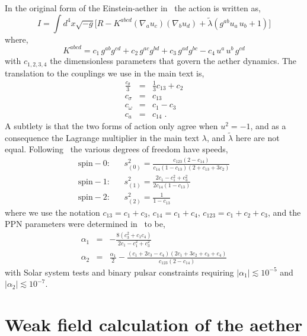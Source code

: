 \documentclass[12pt]{article}
\numberwithin{equation}{section}
\begin{document}
In the original form of the Einstein-aether in~\cite{Jacobson:2004ts} the action is written as,
\begin{equation}
I=\int d^4x\sqrt{-g}\bigg[R-K^{abcd}(\nabla_au_c)(\nabla_bu_d)+\tilde{\lambda}(g^{ab}u_a\,u_b+1)\bigg]
\end{equation}
where,
\begin{equation}
K^{abcd}=c_1\,g^{ab}g^{cd}+c_2\,g^{ac}g^{bd}+c_3\,g^{ad}g^{bc} - c_4\,u^a\,u^b\,g^{cd}
\end{equation}
with $c_{1,2,3,4}$ the dimensionless parameters that govern the aether dynamics. The translation to the couplings we use in the main text is,
\begin{eqnarray}
\frac{c_\theta}{3} & = & \frac{1}{3} c_{13} +  c_2 \\
c_\sigma & = & c_{13} \\
c_\omega & = & c_1 - c_3 \\
c_a  & = &  c_{14} \; .
\end{eqnarray}
A subtlety is that the two forms of action only agree when $u^2 = -1$, and as a consequence the Lagrange multiplier in the main text $\lambda$, and $\tilde{\lambda}$ here are not equal.
Following~\cite{Jacobson:2004ts} the various degrees of freedom have speeds,
\begin{eqnarray}
\mathrm{spin-0}: && s_{(0)}^2 = \frac{ c_{123} \left( 2 - c_{14} \right) }{ c_{14} \left( 1 - c_{13} \right) \left( 2 + c_{13} + 3 c_2 \right)} \\ 
\mathrm{spin-1}: && s_{(1)}^2 = \frac{2 c_1 - c_1^2 + c_3^2}{2 c_{14} \left( 1 - c_{13} \right)} \\ 
\mathrm{spin-2}: && s_{(2)}^2 = \frac{1}{1 - c_{13}}
\end{eqnarray}
where we use the notation $c_{13} = c_1 + c_3$, $c_{14} = c_1 + c_4$, $c_{123} = c_1 + c_2 + c_3$, and the PPN parameters were determined in~\cite{Foster:2005dk} to be,
\begin{eqnarray}
\alpha_1 & = & - \frac{8 \left( c_3^2 + c_1 c_4 \right) }{2 c_1 - c_1^2 + c_3^2} \\
\alpha_2 & = & \frac{\alpha_1}{2} - \frac{\left( c_1 + 2 c_3 - c_4 \right) \left( 2 c_1 + 3 c_2 + c_3 + c_4 \right)}{c_{123} \left( 2 - c_{14} \right) } 
\end{eqnarray} 
with Solar system tests and binary pulsar constraints requiring $|\alpha_1| \lesssim 10^{-5}$ and $|\alpha_2| \lesssim 10^{-7}$.


\section{Weak field calculation of the aether}
\label{app:PPN}
\end{document}
